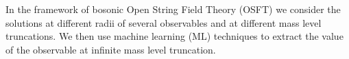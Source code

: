 In the framework of bosonic Open String Field Theory (OSFT) we consider the
solutions at different radii of several observables and at different mass level
truncations.
We then use machine learning (ML) techniques to extract the value of the
observable at infinite mass level truncation.
